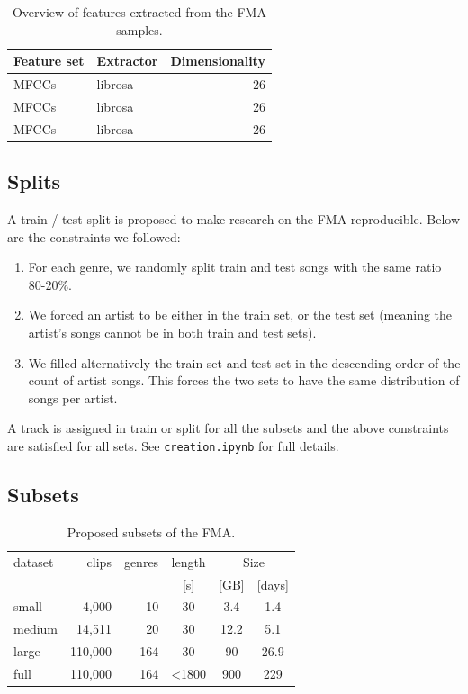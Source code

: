 \documentclass{article}
\begin{document}
\begin{table}
	\centering
	\begin{tabular}{llr}
		\toprule
		Feature set & Extractor & Dimensionality \\
		\midrule
		MFCCs \cite{mfcc} & librosa & 26 \\
		MFCCs \cite{mfcc} & librosa & 26 \\
		MFCCs \cite{mfcc} & librosa & 26 \\
		\bottomrule
	\end{tabular}
	\caption{Overview of features extracted from the FMA samples.}
	\label{tab:features}
\end{table}

\subsection{Splits}

A train / test split is proposed to make research on the FMA reproducible.
Below are the constraints we followed:
\begin{enumerate}
	\item For each genre, we randomly split train and test songs with the same ratio 80-20\%.
	\item We forced an artist to be either in the train set, or the test set (meaning the artist's songs cannot be in both train and test sets).
	\item We filled alternatively the train set and test set in the descending order of the count of artist songs. This forces the two sets to have the same distribution of songs per artist.
\end{enumerate}
A track is assigned in train or split for all the subsets and the above constraints are satisfied for all sets. See \texttt{creation.ipynb} for full details.

\subsection{Subsets} \label{sec:subsets}

\begin{table}
	\centering
	\begin{tabular}{lrrccc}
		\toprule
		dataset & clips & genres & length & \multicolumn{2}{c}{Size} \\
		\cmidrule{5-6}
		        &         &          &  [s]   & [GB] & [days] \\
		\midrule
		small  &   4,000 & 10  & 30    & 3.4  & 1.4  \\
		medium &  14,511 & 20  & 30    & 12.2 & 5.1  \\
		large  & 110,000 & 164 & 30    & 90   & 26.9 \\
		full   & 110,000 & 164 & <1800 & 900  & 229  \\
		\bottomrule
	\end{tabular}
	\caption{Proposed subsets of the FMA.}
	\label{tab:subsets}
\end{table}
\end{document}
